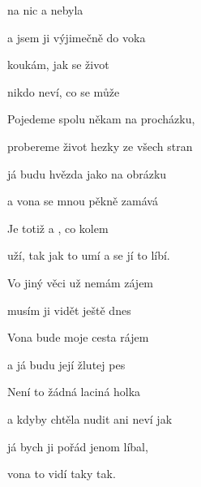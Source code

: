 

\zs
{} na nic a nebyla 

a  jsem ji výjimečně do voka 

 koukám, jak se život 

 nikdo neví, co se může 
\ks

\zs
Pojedeme spolu někam na procházku,

probereme život hezky ze všech stran

já budu hvězda jako na obrázku

a vona se mnou pěkně zamává
\ks

\zr
{Je} totiž  a , co kolem 

 uží, {tak} jak to umí a  se jí to líbí.
\kr

\zs
Vo jiný věci  už nemám zájem

musím ji vidět ještě dnes

Vona bude moje cesta rájem

a já budu její žlutej pes
\ks

\zs
Není to žádná laciná holka

a kdyby chtěla nudit ani neví jak

já bych ji pořád jenom líbal,

vona to vidí taky tak.
\ks

\zr  \kr  \zr  \kr

\kp





